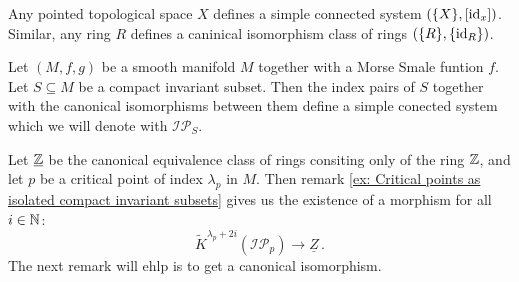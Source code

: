 \begin{example}
	Any pointed topological space $X$ defines a simple connected system $(\{X\},{[\operatorname{\mathrm{id}}_x]})$. Similar, any ring $R$ defines a caninical isomorphism class of rings $(\{R\},\{\operatorname{\mathrm{id}}_R\})$.
\end{example}

\begin{definition}
	Let $(M,f,g)$ be a smooth manifold $M$ together with a Morse Smale funtion $f$. Let $S\subseteq M$ be a compact invariant subset. Then the index pairs of $S$ together with the canonical isomorphisms between them define a simple conected system which we will denote with $\mathcal{IP}_S$.   
\end{definition}
\begin{remark}
	Let $\underline{\mathbb{Z}}$ be the canonical equivalence class of rings consiting only of the ring $\mathbb{Z}$, and let $p$ be a critical point of index $\lambda_p$ in $M$. Then remark \ref{ex: Critical points as isolated compact invariant subsets} gives us the existence of a morphism for all $i\in \mathbb{N}$:
	\begin{equation*}
		\tilde{K}^{\lambda_p+2i}(\mathcal{IP}_p)\to \underline{Z}\,.
	\end{equation*} The next remark will ehlp is to get a canonical isomorphism.
\end{remark}


